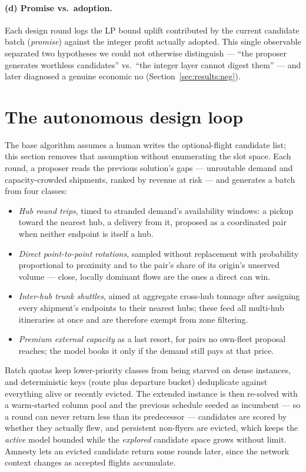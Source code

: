 \documentclass[11pt]{article}
\begin{document}
\paragraph{(d) Promise vs.\ adoption.} Each design round logs the LP bound
uplift contributed by the current candidate batch (\emph{promise}) against
the integer profit actually adopted. This single observable separated two
hypotheses we could not otherwise distinguish --- ``the proposer generates
worthless candidates'' vs.\ ``the integer layer cannot digest them'' ---
and later diagnosed a genuine economic no (Section~\ref{sec:results:neg}).

\section{The autonomous design loop}\label{sec:design}

The base algorithm assumes a human writes the optional-flight candidate
list; this section removes that assumption without enumerating the slot
space. Each round, a proposer reads the previous solution's gaps ---
unroutable demand and capacity-crowded shipments, ranked by revenue at risk
--- and generates a batch from four classes:

\begin{itemize}
\item \emph{Hub round trips}, timed to stranded demand's availability
  windows: a pickup toward the nearest hub, a delivery from it, proposed as a
  coordinated pair when neither endpoint is itself a hub.
\item \emph{Direct point-to-point rotations}, sampled without replacement
  with probability proportional to proximity and to the pair's share of its
  origin's unserved volume --- close, locally dominant flows are the ones a
  direct can win.
\item \emph{Inter-hub trunk shuttles}, aimed at aggregate cross-hub tonnage
  after assigning every shipment's endpoints to their nearest hubs; these
  feed all multi-hub itineraries at once and are therefore exempt from zone
  filtering.
\item \emph{Premium external capacity} as a last resort, for pairs no
  own-fleet proposal reaches; the model books it only if the demand still
  pays at that price.
\end{itemize}

Batch quotas keep lower-priority classes from being starved on dense
instances, and deterministic keys (route plus departure bucket) deduplicate
against everything alive or recently evicted. The extended instance is then
re-solved with a warm-started column pool and the previous schedule seeded as
incumbent --- so a round can never return less than its predecessor ---
candidates are scored by whether they actually flew, and persistent
non-flyers are evicted, which keeps the \emph{active} model bounded while the
\emph{explored} candidate space grows without limit. Amnesty lets an evicted
candidate return some rounds later, since the network context changes as
accepted flights accumulate.
\end{document}
